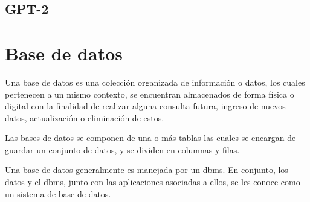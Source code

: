 \documentclass[12pt, a4paper, titlepage]{report}
\begin{document}
				\subsection{GPT-2}
                

        \section{Base de datos}
        Una base de datos es una colección organizada de información o datos, los cuales pertenecen a un mismo contexto, se encuentran almacenados de forma física o digital con la finalidad de realizar alguna consulta futura, ingreso de nuevos datos, actualización o eliminación de estos.\par
		Las bases de datos se componen de una o más tablas las cuales se encargan de guardar un conjunto de datos, y se dividen en columnas y filas.\par
		Una base de datos generalmente es manejada por un \acrfull{dbms}. En conjunto, los datos y el \acrshort{dbms}, junto con las aplicaciones asociadas a ellos, se les conoce como un sistema de base de datos.\cite{refQueEsBD}\par
\end{document}
